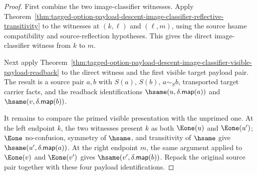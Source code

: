 \begin{proof}
First combine the two image-classifier witnesses. Apply
Theorem~\ref{thm:tagged-option-payload-descent-image-classifier-reflective-transitivity}
to the witnesses at $(k,\ell)$ and $(\ell,m)$, using the source hsame
compatibility and source-reflection hypotheses. This gives the direct
image-classifier witness from $k$ to $m$.

Next apply
Theorem~\ref{thm:tagged-option-payload-descent-image-classifier-visible-payload-readback}
to the direct witness and the first visible target payload pair. The result is a
source pair $a,b$ with $S(a)$, $S(b)$, $a\sim_S b$, transported target carrier
facts, and the readback identifications
$\hsame(u,\delta.\mathsf{map}(a))$ and
$\hsame(v,\delta.\mathsf{map}(b))$.

It remains to compare the primed visible presentation with the unprimed one.
At the left endpoint $k$, the two witnesses present $k$ as both $\Eone(u)$ and
$\Eone(u')$; $\Eone$ no-confusion, symmetry of $\hsame$, and transitivity of
$\hsame$ give $\hsame(u',\delta.\mathsf{map}(a))$. At the right endpoint $m$,
the same argument applied to $\Eone(v)$ and $\Eone(v')$ gives
$\hsame(v',\delta.\mathsf{map}(b))$. Repack the original source pair together
with these four payload identifications.
\end{proof}
